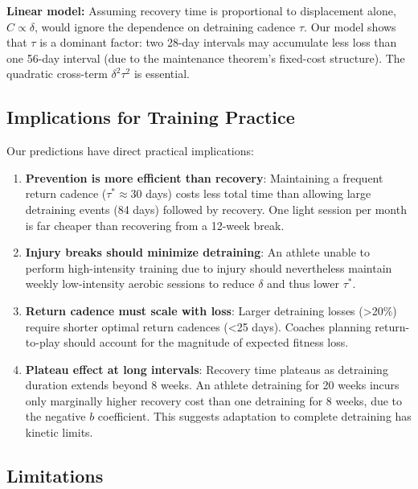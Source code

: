 \documentclass[12pt,a4paper]{article}
\begin{document}
\textbf{Linear model:} Assuming recovery time is proportional to displacement alone, $C \propto \delta$, would ignore the dependence on detraining cadence $\tau$. Our model shows that $\tau$ is a dominant factor: two 28-day intervals may accumulate less loss than one 56-day interval (due to the maintenance theorem's fixed-cost structure). The quadratic cross-term $\delta^2 \tau^2$ is essential.

\subsection{Implications for Training Practice}

Our predictions have direct practical implications:

\begin{enumerate}
\item \textbf{Prevention is more efficient than recovery}: Maintaining a frequent return cadence ($\tau^* \approx 30$ days) costs less total time than allowing large detraining events (84 days) followed by recovery. One light session per month is far cheaper than recovering from a 12-week break.

\item \textbf{Injury breaks should minimize detraining}: An athlete unable to perform high-intensity training due to injury should nevertheless maintain weekly low-intensity aerobic sessions to reduce $\delta$ and thus lower $\tau^*$.

\item \textbf{Return cadence must scale with loss}: Larger detraining losses (>20\%) require shorter optimal return cadences (<25 days). Coaches planning return-to-play should account for the magnitude of expected fitness loss.

\item \textbf{Plateau effect at long intervals}: Recovery time plateaus as detraining duration extends beyond 8 weeks. An athlete detraining for 20 weeks incurs only marginally higher recovery cost than one detraining for 8 weeks, due to the negative $b$ coefficient. This suggests adaptation to complete detraining has kinetic limits.

\end{enumerate}

\subsection{Limitations}
\end{document}
